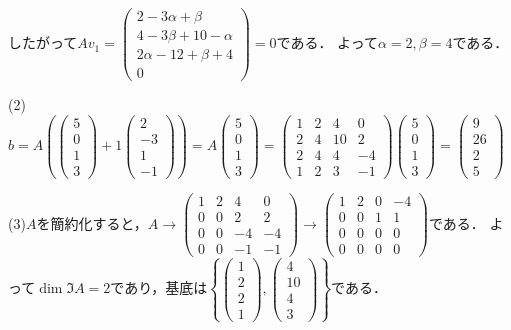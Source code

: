 \documentclass[
		book,
		head_space=20mm,
		foot_space=20mm,
		gutter=10mm,
		line_length=190mm
]{jlreq}
\begin{document}
したがって$Av_1=\begin{pmatrix}
2-3\alpha+\beta\\
4-3\beta+10-\alpha\\
2\alpha-12+\beta+4\\
0
\end{pmatrix}=0$である．
よって$\alpha=2,\beta=4$である．

(2)$b=A(\begin{pmatrix}
5\\0\\1\\3
\end{pmatrix}+1\begin{pmatrix}
2\\-3\\1\\-1
\end{pmatrix})=A\begin{pmatrix}
5\\0\\1\\3
\end{pmatrix}=\begin{pmatrix}
1&2&4&0\\
2&4&10&2\\
2&4&4&-4\\
1&2&3&-1
\end{pmatrix}\begin{pmatrix}
5\\0\\1\\3
\end{pmatrix}=\begin{pmatrix}
9\\26\\2\\5
\end{pmatrix}$

(3)$A$を簡約化すると，$A\rightarrow \begin{pmatrix}
1&2&4&0\\
0&0&2&2\\
0&0&-4&-4\\
0&0&-1&-1
\end{pmatrix}\rightarrow \begin{pmatrix}
1&2&0&-4\\
0&0&1&1\\
0&0&0&0\\
0&0&0&0
\end{pmatrix}$である．
よって$\dim \Im A=2$であり，基底は$\left\{ \begin{pmatrix}
1\\2\\2\\1
\end{pmatrix},\begin{pmatrix}
4\\10\\4\\3
\end{pmatrix} \right\}$である．
\end{document}
